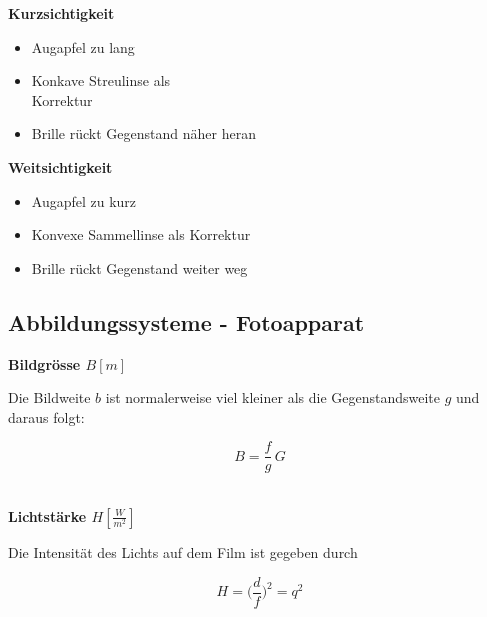 \begin{minipage}{0.48\linewidth}
\textbf{Kurzsichtigkeit} 
\raggedright
\begin{itemize}

\item Augapfel zu lang
\item Konkave Streulinse als\\
	 Korrektur
\item Brille rückt Gegenstand näher heran 

\end{itemize}


\end{minipage}
\hfill
\begin{minipage}{0.48\linewidth}
\raggedright
\textbf{Weitsichtigkeit}
\begin{itemize}

\item Augapfel zu kurz
\item Konvexe Sammellinse als Korrektur
\item Brille rückt Gegenstand weiter weg 

\end{itemize}


\end{minipage}



\subsection{Abbildungssysteme - Fotoapparat}

\textbf{Bildgrösse $B [m]$} 

\begin{minipage}{0.48\linewidth}
Die Bildweite $b$ ist normalerweise viel kleiner als die
Gegenstandsweite $g$ und daraus folgt: \\
\end{minipage}
\hfill
\begin{minipage}{0.48\linewidth}
$$ \boxed{ B = \frac{f}{g} \, G }$$ \\
\end{minipage}


\textbf{Lichtstärke $H [\frac{W}{m^2}]$} 

\begin{minipage}{0.48\linewidth}
Die Intensität des Lichts auf dem Film ist gegeben durch \\
\end{minipage}
\hfill
\begin{minipage}{0.48\linewidth}
$$ \boxed{ H = \Big(  \frac{d}{f} \Big)^2 = q^2 } $$ \\
\end{minipage}




